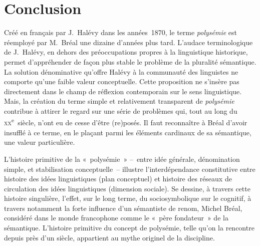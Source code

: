 \documentclass[output=paper]{langsci/langscibook}
\begin{document}
\section{Conclusion}

Créé en français par J.~Halévy dans les années~1870, le terme \textit{polysémie} est réemployé par M.~Bréal une dizaine d’années plus tard. L’audace terminologique de J.~Halévy, en dehors des préoccupations propres à la linguistique historique, permet d’appréhender de façon plus stable le problème de la pluralité sémantique. La solution dénominative qu’offre Halévy à la communauté des linguistes ne comporte qu’une faible valeur conceptuelle. Cette proposition ne s’insère pas directement dans le champ de réflexion contemporain sur le sens linguistique. Mais, la création du terme simple et relativement transparent de \textit{polysémie} contribue à attirer le regard sur une série de problèmes qui, tout au long du \textsc{xx}\textsuperscript{e}~siècle, n’ont eu de cesse d’être (re)posés. Il faut reconnaître à Bréal d’avoir insufflé à ce terme, en le plaçant parmi les éléments cardinaux de sa sémantique, une valeur particulière.

L’histoire primitive de la «~polysémie~» –~entre idée générale, dénomination simple, et stabilisation conceptuelle~– illustre l’interdépendance constitutive entre histoire des idées linguistiques (plan conceptuel) et histoire des réseaux de circulation des idées linguistiques (dimension sociale). Se dessine, à travers cette histoire singulière, l’effet, sur le long terme, du sociosymbolique sur le cognitif, à travers notamment la forte influence d’un sémantiste de renom, Michel Bréal, considéré dans le monde francophone comme le «~père fondateur~» de la sémantique. L’histoire primitive du concept de polysémie, telle qu’on la rencontre depuis près d’un siècle, appartient au mythe originel de la discipline.
\end{document}
